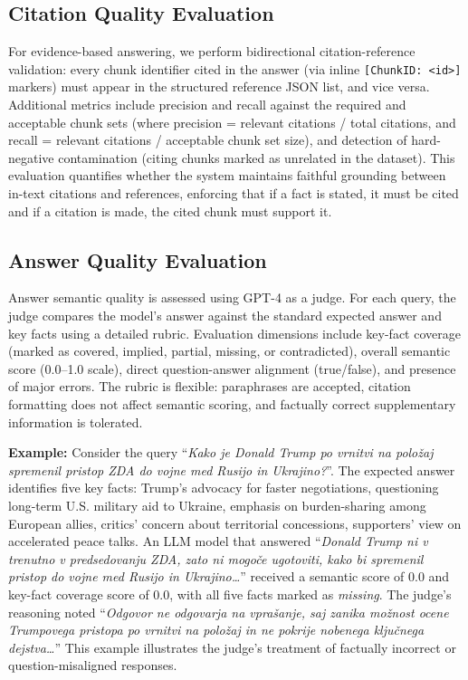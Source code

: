 \documentclass[conference]{IEEEtran}
\begin{document}
\subsection{Citation Quality Evaluation}
For evidence-based answering, we perform bidirectional citation-reference validation: every chunk identifier cited in the answer (via inline \texttt{[ChunkID: <id>]} markers) must appear in the structured reference JSON list, and vice versa. Additional metrics include precision and recall against the required and acceptable chunk sets (where precision = relevant citations / total citations, and recall = relevant citations / acceptable chunk set size), and detection of hard-negative contamination (citing chunks marked as unrelated in the dataset). This evaluation quantifies whether the system maintains faithful grounding between in-text citations and references, enforcing that if a fact is stated, it must be cited and if a citation is made, the cited chunk must support it.

\subsection{Answer Quality Evaluation}
Answer semantic quality is assessed using GPT-4 as a judge. For each query, the judge compares the model's answer against the standard expected answer and key facts using a detailed rubric. Evaluation dimensions include key-fact coverage (marked as covered, implied, partial, missing, or contradicted), overall semantic score (0.0--1.0 scale), direct question-answer alignment (true/false), and presence of major errors. The rubric is flexible: paraphrases are accepted, citation formatting does not affect semantic scoring, and factually correct supplementary information is tolerated.

\textbf{Example:} Consider the query ``\textit{Kako je Donald Trump po vrnitvi na položaj spremenil pristop ZDA do vojne med Rusijo in Ukrajino?}''. The expected answer identifies five key facts: Trump's advocacy for faster negotiations, questioning long-term U.S. military aid to Ukraine, emphasis on burden-sharing among European allies, critics' concern about territorial concessions, supporters' view on accelerated peace talks. An LLM model that answered ``\textit{Donald Trump ni v trenutno v predsedovanju ZDA, zato ni mogoče ugotoviti, kako bi spremenil pristop do vojne med Rusijo in Ukrajino\dots}'' received a semantic score of 0.0 and key-fact coverage score of 0.0, with all five facts marked as \textit{missing}. The judge's reasoning noted ``\textit{Odgovor ne odgovarja na vprašanje, saj zanika možnost ocene Trumpovega pristopa po vrnitvi na položaj in ne pokrije nobenega ključnega dejstva\dots}''  This example illustrates the judge's treatment of factually incorrect or question-misaligned responses.
\end{document}
